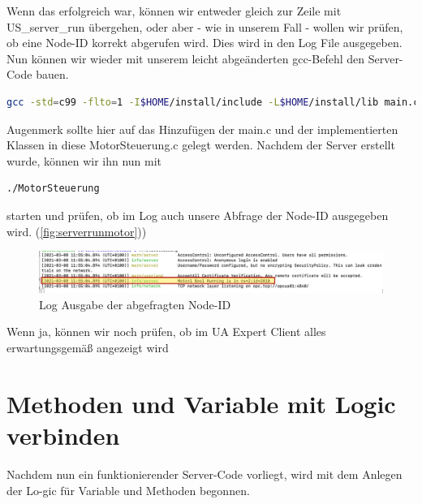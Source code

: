 	Wenn das erfolgreich war, können wir entweder gleich zur Zeile mit US\_server\_run übergehen, oder aber - wie in unserem Fall - wollen wir prüfen, ob eine Node-ID korrekt abgerufen wird. Dies wird in den Log File ausgegeben.
	Nun können wir wieder mit unserem leicht abgeänderten gcc-Befehl den Server-Code bauen.
	\begin{lstlisting}[language=Bash]
	gcc -std=c99 -flto=1 -I$HOME/install/include -L$HOME/install/lib main.c MotorSteuerung.c -lopen62541 -lmbedtls -lmbedx509 -lmbedcrypto -o MotorSteuerung
\end{lstlisting}
	Augenmerk sollte hier auf das Hinzufügen der main.c und der implementierten Klassen in diese MotorSteuerung.c gelegt werden.
	Nachdem der Server erstellt wurde, können wir ihn nun mit
	\begin{lstlisting}[language=Bash]
	./MotorSteuerung
\end{lstlisting}
	starten und prüfen, ob im Log auch unsere Abfrage der Node-ID ausgegeben wird. (\autoref{fig:serverrunmotor}))
\begin{figure}[H]
	\centering
	\includegraphics[width=1\linewidth]{abb/ServerRunMotor}
	\caption{Log Ausgabe der abgefragten Node-ID}
	\label{fig:serverrunmotor}
\end{figure}

Wenn ja, können wir noch prüfen, ob im UA Expert Client alles erwartungsgemäß angezeigt wird
\clearpage
\section{Methoden und Variable mit Logic verbinden}
Nachdem nun ein funktionierender Server-Code vorliegt, wird mit dem Anlegen der Lo-gic für Variable und Methoden begonnen.

